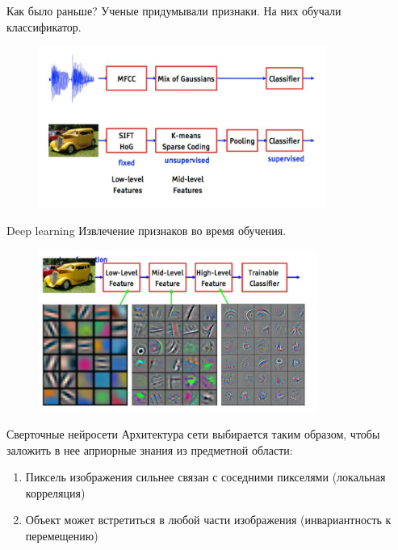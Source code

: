 \documentclass[10pt]{beamer}
\begin{document}
\begin{frame}{Как было раньше?}
	Ученые придумывали признаки. На них обучали классификатор.\\
	
	\begin{figure}[htbp]
	  \includegraphics[height=150pt, keepaspectratio = true]{images/old_approach}   
	\end{figure}
\end{frame}

\begin{frame}{Deep learning}
  Извлечение признаков во время обучения.\\

	\begin{figure}[htbp]
	  \includegraphics[height=150pt, keepaspectratio = true]{images/deep_learning}   
	\end{figure}
\end{frame}

\begin{frame}{Сверточные нейросети}
	Архитектура сети выбирается таким образом, чтобы заложить в нее априорные знания из предметной области:\\
	\pause
	\begin{enumerate}[<+->]
		\item Пиксель изображения сильнее связан с соседними пикселями (локальная корреляция)
		\item Объект может встретиться в любой части изображения (инвариантность к перемещению)
	\end{enumerate}
\end{frame}
\end{document}
